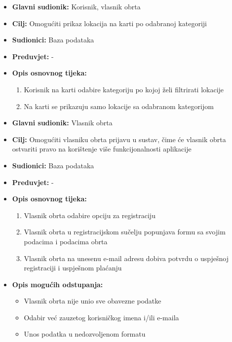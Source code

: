 			\noindent{}
				\begin{itemize}
					\item \textbf{Glavni sudionik: } Korisnik, vlasnik obrta 
					\item \textbf{Cilj: }Omogućiti prikaz lokacija na karti po odabranoj kategoriji
					\item \textbf{Sudionici: } Baza podataka 
					\item \textbf{Preduvjet: } -
					\item \textbf{Opis osnovnog tijeka: }
					\begin{enumerate}
						\item Korisnik na karti odabire kategoriju po kojoj želi filtrirati lokacije
						\item Na karti se prikazuju samo lokacije sa odabranom kategorijom
					\end{enumerate}
				\end{itemize}		
				
			\noindent{}
				\begin{itemize}
					\item \textbf{Glavni sudionik: } Vlasnik obrta 
					\item \textbf{Cilj: }Omogućiti vlasniku obrta prijavu u sustav, čime će vlasnik obrta ostvariti pravo na korištenje više funkcijonalnosti aplikacije
					\item \textbf{Sudionici: } Baza podataka 
					\item \textbf{Preduvjet: } -
					\item \textbf{Opis osnovnog tijeka: }
					\begin{enumerate}
			    		\item Vlasnik obrta odabire opciju za registraciju
						\item Vlasnik obrta u registracijskom sučelju popunjava formu sa svojim podacima i podacima obrta
                        \item Vlasnik obrta na unesenu e-mail adresu dobiva potvrdu o uspješnoj registraciji i uspješnom plaćanju
					\end{enumerate}
                    \item \textbf{Opis mogućih odstupanja:}
					\begin{itemize}
						\item Vlasnik obrta nije unio sve obavezne podatke
						\item Odabir već zauzetog korisničkog imena i/ili e-maila
						\item Unos podatka u nedozvoljenom formatu
					\end{itemize}
				\end{itemize}

